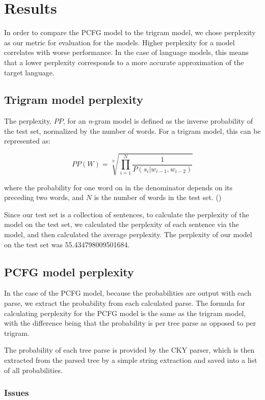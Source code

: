 \documentclass{article}
\begin{document}
\section{Results}
In order to compare the PCFG model to the trigram model, we chose perplexity as our metric for evaluation for the models. Higher perplexity for a model correlates with worse performance. In the case of language models, this means that a lower perplexity corresponds to a more accurate approximation of the target language. 

\subsection{Trigram model perplexity}
The perplexity, $PP$, for an \textit{n}-gram model is defined as the inverse probability of the test set, normalized by the number of words. For a trigram model, this can be represented as:

\begin{equation*}
PP(W)= \sqrt[N]{\prod_{i=1}^{N} \frac{1}{P(s_{i} | w_{i-1}, w_{i-2})} }
\end{equation*}

where the probability for one word on in the denominator depends on its preceding two words, and $N$ is the number of words in the test set. (\cite{jurafskymartin})  

Since our test set is a collection of sentences, to calculate the perplexity of the model on the test set, we calculated the perplexity of each sentence via the model, and then calculated the average perplexity. The perplexity of our model on the test set was  55.434798009501684.

\subsection{PCFG model perplexity}
In the case of the PCFG model, because the probabilities are output with each parse, we extract the probability from each calculated parse. The formula for calculating perplexity for the PCFG model is the same as the trigram model, with the difference being that the probability is per tree parse as opposed to per trigram.

The probability of each tree parse is provided by the CKY parser, which is then extracted from the parsed tree by a simple string extraction and saved into a list of all probabilities.

\subsubsection{Issues}
\end{document}
